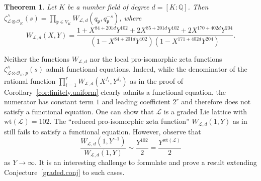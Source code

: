 \documentclass[11pt,a4paper]{amsart}
\theoremstyle{plain}
\newtheorem{thm}{Theorem}[section]
\theoremstyle{remark}
\newcommand{\Q}{\mathbb{Q}}
\newcommand{\tensor}{\otimes}
\newcommand{\p}{\mathfrak{p}}
\def \p {\ensuremath{\mathfrak{p}}}
\begin{document}
\begin{thm} \label{thm:no.funct.eq}
Let $K$ be a number field of degree $d = [K : \Q]$.  Then $\zeta^\wedge_{\mathcal{L} \tensor \mathcal{O}_K}(s) = \prod_{\p \in V_K} W_{\mathcal{L},d}(q_\p, q_\p^{-s})$, where
\begin{equation*}
W_{\mathcal{L},d}(X,Y) = \frac{1 + X^{84 + 201d}Y^{102} + 2 X^{85 + 201d} Y^{102} + 2 X^{170 + 402d} Y^{204}}{(1 - X^{84 + 201d} Y^{102})(1 - X^{171 + 402d}Y^{204})}.
\end{equation*}
\end{thm}
Neither the functions $W_{\mathcal{L},d}$ nor the local pro-isomorphic zeta functions $\zeta^\wedge_{\mathcal{L} \tensor \mathcal{O}_K, p}(s)$ admit functional equations.  Indeed, while the denominator of the rational function $\prod_{i = 1}^r W_{\mathcal{L},d}(X^{f_i}, Y^{f_i})$ as in the proof of Corollary~\ref{cor:finitely.uniform} clearly admits a functional equation, the numerator has constant term $1$ and leading coefficient $2^r$ and therefore does not satisfy a functional equation.  
One can show that $\mathcal{L}$ is a graded Lie lattice with $\mathrm{wt}(\mathcal{L}) = 102$.  The ``reduced pro-isomorphic zeta function'' $W_{\mathcal{L},d}(1,Y)$ as in~\cite[(1)]{Evseev/09} still fails to satisfy a functional equation.  However, observe that
$$ \frac{W_{\mathcal{L},d}(1,Y^{-1})}{W_{\mathcal{L},d}(1,Y)} \sim \frac{Y^{102}}{2} =  \frac{Y^{\mathrm{wt}(\mathcal{L})}}{2}$$
as $Y \to \infty$.  It is an interesting challenge to formulate and prove a result extending Conjecture~\ref{graded.conj} to such cases.
\end{document}
